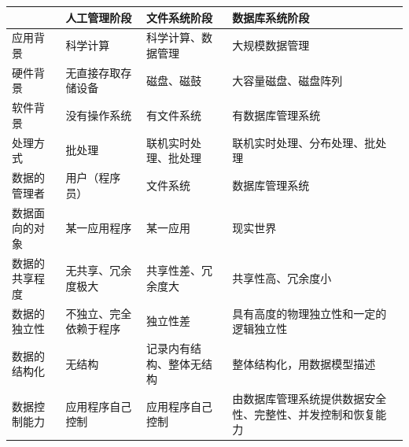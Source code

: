 \vspace{-0.5em}
\begin{longtable}{|W{c}{2.5cm}|W{c}{3.8cm}|W{c}{4.2cm}|m{4cm}<{\centering}|}
    \hline
    \textbf{} & \textbf{人工管理阶段} & \textbf{文件系统阶段} & \textbf{数据库系统阶段}              \\ \hline
    应用背景      & 科学计算            & 科学计算、数据管理       & 大规模数据管理                       \\ \hline
    硬件背景      & 无直接存取存储设备       & 磁盘、磁鼓           & 大容量磁盘、磁盘阵列                    \\ \hline
    软件背景      & 没有操作系统          & 有文件系统           & 有数据库管理系统                      \\ \hline
    处理方式      & 批处理             & 联机实时处理、批处理      & 联机实时处理、分布处理、批处理               \\ \hline
    数据的管理者    & 用户（程序员）         & 文件系统            & 数据库管理系统                       \\ \hline
    数据面向的对象   & 某一应用程序          & 某一应用            & 现实世界                          \\ \hline
    数据的共享程度   & 无共享、冗余度极大       & 共享性差、冗余度大       & 共享性高、冗余度小                     \\ \hline
    数据的独立性    & 不独立、完全依赖于程序     & 独立性差            & 具有高度的物理独立性和一定的逻辑独立性           \\ \hline
    数据的结构化    & 无结构             & 记录内有结构、整体无结构    & 整体结构化，用数据模型描述                 \\ \hline
    数据控制能力    & 应用程序自己控制        & 应用程序自己控制        & 由数据库管理系统提供数据安全性、完整性、并发控制和恢复能力 \\ \hline
    \end{longtable}
\vspace{-1em}

